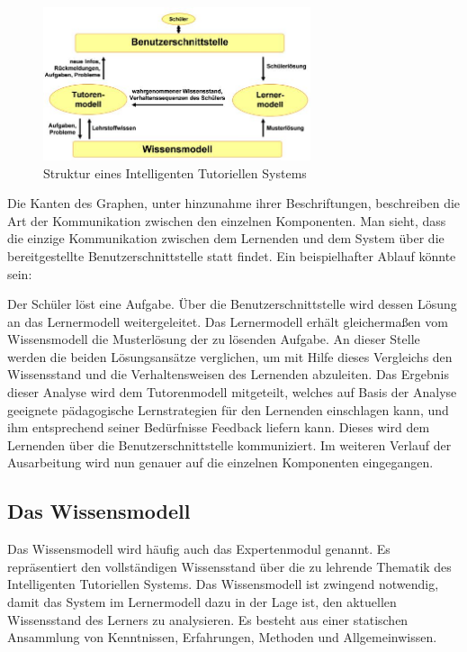 \begin{figure}[!htb]
	\centering
    \includegraphics[width=0.7\textwidth]{bilder/its_structure.jpg} %
	\caption{Struktur eines Intelligenten Tutoriellen Systems}
\end{figure}

Die Kanten des Graphen, unter hinzunahme ihrer Beschriftungen, beschreiben die Art der
Kommunikation zwischen den einzelnen Komponenten.
Man sieht, dass die einzige Kommunikation zwischen dem Lernenden und dem System über die
bereitgestellte Benutzerschnittstelle statt findet. Ein beispielhafter Ablauf könnte sein:

Der Schüler löst eine Aufgabe. Über die Benutzerschnittstelle wird dessen Lösung
an das Lernermodell weitergeleitet. Das Lernermodell erhält gleichermaßen vom Wissensmodell
die Musterlösung der zu lösenden Aufgabe. An dieser Stelle werden die beiden Lösungsansätze
verglichen, um mit Hilfe dieses Vergleichs den Wissensstand und die Verhaltensweisen
des Lernenden abzuleiten. Das Ergebnis dieser Analyse wird dem Tutorenmodell mitgeteilt, welches
auf Basis der Analyse geeignete pädagogische Lernstrategien für den Lernenden einschlagen kann,
und ihm entsprechend seiner Bedürfnisse Feedback liefern kann. Dieses wird dem Lernenden
über die Benutzerschnittstelle kommuniziert. Im weiteren Verlauf der Ausarbeitung
wird nun genauer auf die einzelnen Komponenten eingegangen.

\subsection{Das Wissensmodell}

Das Wissensmodell wird häufig auch das Expertenmodul genannt. Es repräsentiert den vollständigen
Wissensstand über die zu lehrende Thematik des Intelligenten Tutoriellen Systems.
Das Wissensmodell ist zwingend notwendig, damit das System im Lernermodell dazu in der Lage ist,
den aktuellen Wissensstand des Lerners zu analysieren.
Es besteht aus einer statischen Ansammlung von Kenntnissen, Erfahrungen, Methoden und Allgemeinwissen.

